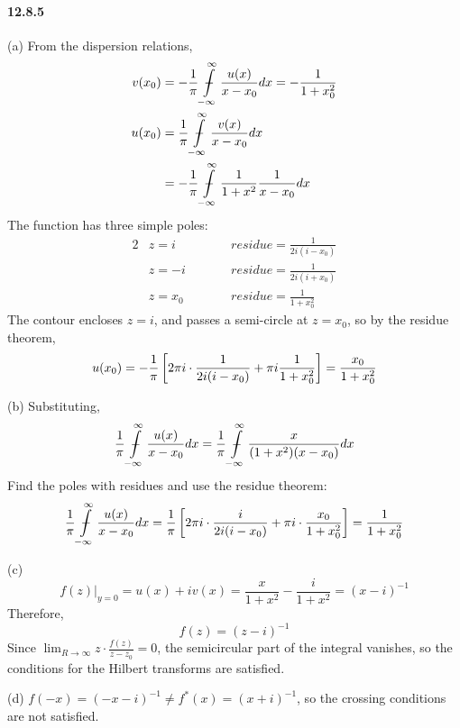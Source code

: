 \documentclass[a4paper]{article}
\begin{document}
\paragraph{12.8.5}
(a)
From the dispersion relations, 
\begin{equation*}
    \begin{split}
        v(x_0)&=-\frac{1}{\pi}\ddashint\displaylimits_{-\infty}^\infty\frac{u(x)}{x-x_0}dx=-\frac{1}{1+x_0^2}\\
        u(x_0) & =\frac{1}{\pi}\ddashint\displaylimits_{-\infty}^\infty \frac{v(x)}{x-x_0}dx\\
        & =-\frac{1}{\pi}\ddashint\displaylimits_{-\infty}^\infty\frac{1}{1+x^2}\frac{1}{x-x_0}dx
    \end{split}
\end{equation*}
The function has three simple poles:
\begin{alignat*}{2}
    & z=i\qquad && residue=\frac{1}{2i(i-x_0)}\\
    & z=-i\qquad && residue=\frac{1}{2i(i+x_0)}\\
    & z=x_0\qquad && residue=\frac{1}{1+x_0^2}
\end{alignat*}
The contour encloses $z=i$, and passes a semi-circle at $z=x_0$, so by the residue theorem,
\[
u(x_0)=-\frac{1}{\pi}\left[2\pi i\cdot\frac{1}{2i(i-x_0)}+\pi i\frac{1}{1+x_0^2} \right]=\frac{x_0}{1+x_0^2}
\]

(b)
Substituting,
\[
\frac{1}{\pi}\ddashint\displaylimits_{-\infty}^\infty\frac{u(x)}{x-x_0}dx=\frac{1}{\pi}\ddashint\displaylimits_{-\infty}^\infty\frac{x}{(1+x^2)(x-x_0)}dx
\]
Find the poles with residues and use the residue theorem:
\[
\frac{1}{\pi}\ddashint\displaylimits_{-\infty}^\infty\frac{u(x)}{x-x_0}dx  =\frac{1}{\pi}\lfbr{2\pi i\cdot\frac{i}{2i(i-x_0)}+\pi i\cdot\frac{x_0}{1+x_0^2} }=\frac{1}{1+x_0^2}
\]

(c)
\[
f(z)|_{y=0}=u(x)+iv(x)=\frac{x}{1+x^2}-\frac{i}{1+x^2}=(x-i)^{-1}
\]
Therefore,
\[
f(z)=(z-i)^{-1}
\]
Since $\lim_{R\to\infty}z\cdot\frac{f(z)}{z-z_0}=0$, the semicircular part of the integral vanishes, so the conditions for the Hilbert transforms are satisfied.
\medskip

(d)
$f(-x)=(-x-i)^{-1}\neq f^*(x)=(x+i)^{-1}$, so the crossing conditions are not satisfied.
\end{document}
